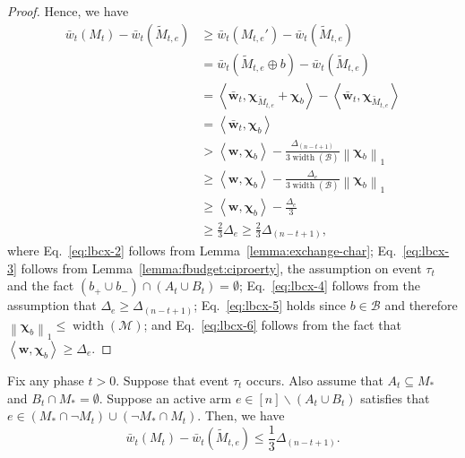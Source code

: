 \documentclass{article}
\newcommand{\M}{\mathcal M}
\newcommand{\B}{\mathcal B}
\newcommand{\del}{\backslash}
\DeclareMathOperator{\rank}{width}
\newcommand{\inn}[1]{\left\langle #1 \right\rangle}
\newcommand{\nor}[1]{\left\|#1\right\|}
\renewcommand{\vec}[1]{\boldsymbol{#1}}
\begin{document}
\begin{proof}
Hence, we have
\begin{align}
\bar w_t(M_t) - \bar w_t(\tilde M_{t,e}) &\ge 
\bar w_t(M_{t,e}') - \bar w_t(\tilde M_{t,e}) \nonumber \\
&= \bar w_t(\tilde M_{t,e} \oplus b ) - \bar w_t(\tilde M_{t,e}) \nonumber \\
&= \inn{\vec {\bar w}_t, \vec\chi_{\tilde M_{t,e}}+\vec\chi_b}-\inn{\vec {\bar w}_t, \vec\chi_{\tilde M_{t,e}}} \label{eq:lbcx-2}\\
&= \inn{\vec {\bar w}_t, \vec\chi_b} \nonumber\\
&> \inn{\vec w, \vec\chi_b}-\frac{\Delta_{(n-t+1)}}{3\rank(\B)}\nor{\vec\chi_b}_1 \label{eq:lbcx-3}\\
&\ge \inn{\vec w, \vec\chi_b}-\frac{\Delta_e}{3\rank(\B)}\nor{\vec\chi_b}_1 \label{eq:lbcx-4}\\
&\ge \inn{\vec w, \vec\chi_b}-\frac{\Delta_e}{3}\label{eq:lbcx-5}\\
&\ge \frac{2}{3}\Delta_e \ge \frac{2}{3}\Delta_{(n-t+1)},\label{eq:lbcx-6}
\end{align}
where Eq.~\eqref{eq:lbcx-2} follows from Lemma~\ref{lemma:exchange-char};
Eq.~\eqref{eq:lbcx-3} follows from Lemma~\ref{lemma:fbudget:ciproerty}, the assumption on event $\tau_t$ and the fact $(b_+\cup b_-) \cap (A_t \cup B_t) = \emptyset$;
Eq.~\eqref{eq:lbcx-4} follows from the assumption that $\Delta_e \ge \Delta_{(n-t+1)}$;
Eq.~\eqref{eq:lbcx-5} holds since $b\in \B$ and therefore $\nor{\vec\chi_b}_1  \le \rank(\M)$;
and Eq.~\eqref{eq:lbcx-6} follows from the fact that $\inn{\vec w, \vec\chi_b} \ge \Delta_e$.

\end{proof}

\begin{lemma}
\label{lemma-budget-e}
Fix any phase $t>0$. 
Suppose that event $\tau_t$ occurs.
Also assume that $A_t \subseteq M_*$ and $B_t \cap M_* = \emptyset$.
Suppose an active arm $e\in [n] \del (A_t\cup B_t)$  satisfies that $e\in (M_*\cap \neg M_t) \cup (\neg M_* \cap M_t)$. 
Then, we have
$$
\bar w_t(M_t) - \bar w_t(\tilde M_{t,e}) \le \frac{1}{3} \Delta_{(n-t+1)}.
$$
\end{lemma}
\end{document}
